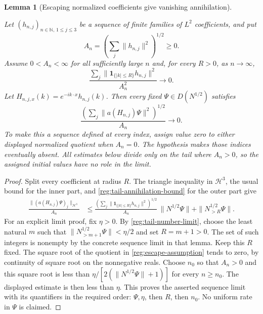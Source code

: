 \documentclass[11pt,a4paper]{article}
\newtheorem{lemma}[theorem]{Lemma}
\theoremstyle{definition}
\theoremstyle{remark}
\newcommand{\proofid}[1]{\par\smallskip{\normalfont\scriptsize\color{inkblue}Stable ID: \nolinkurl{#1}}\par\smallskip}
\begin{document}
\begin{lemma}[Escaping normalized coefficients give vanishing annihilation]
\label{reg:annihilation_escape}
\proofid{reg:annihilation_escape}
\par{}\par\smallskip

Let \((h_{n,j})_{n\in\mathbb N,\,1\leq j\leq3}\) be a sequence of
finite families of \(L^2\) coefficients, and put
\[
 A_n=\left(\sum_j\|h_{n,j}\|^2\right)^{1/2}\geq0.
\]
Assume \(0<A_n<\infty\) for all sufficiently large \(n\) and, for every
\(R>0\), as \(n\to\infty\),
\begin{equation}
 \frac{\sum_j\|\mathbf1_{\{|k|\leq R\}}h_{n,j}\|^2}{A_n^2}
 \longrightarrow0.
 \label{reg:escape-assumption}
\end{equation}
Let \(H_{n,j,x}(k)=e^{-ik\cdot x}h_{n,j}(k)\).  Then every fixed
\(\Psi\in D(N^{1/2})\) satisfies
\begin{equation}
 \frac{\left(\sum_j\|a(H_{n,j})\Psi\|^2\right)^{1/2}}{A_n}
 \longrightarrow0.
 \label{reg:escape-conclusion}
\end{equation}
To make this a sequence defined at every index, assign value zero
to either displayed normalized quotient when $A_n=0$. The
hypothesis makes those indices eventually absent. All estimates
below divide only on the tail where $A_n>0$, so the assigned
initial values have no role in the limit.
\end{lemma}
\begin{proof}
Split every coefficient at radius \(R\).  The triangle inequality in
\(\mathcal H^3\), the usual bound for the inner part, and
\eqref{reg:tail-annihilation-bound} for the outer part give
\begin{align*}
 \frac{\|(a(H_{n,j})\Psi)_j\|_{\mathcal H^3}}{A_n}
 &\leq
 \frac{\left(\sum_j\|\mathbf1_{\{|k|\leq R\}}h_{n,j}\|^2\right)^{1/2}}
      {A_n}\,\|N^{1/2}\Psi\|
      +\|N_{>R}^{1/2}\Psi\|.
\end{align*}
For an explicit limit proof, fix \(\eta>0\). By
\eqref{reg:tail-number-limit}, choose the least natural $m$ such that
$\|N_{>m+1}^{1/2}\Psi\|<\eta/2$ and set $R=m+1>0$.
The set of such integers is nonempty by the concrete sequence
limit in that lemma. Keep this \(R\) fixed. The square root of the
quotient in \eqref{reg:escape-assumption} tends to zero, by continuity
of square root on the nonnegative reals. Choose \(n_0\) so that
\(A_n>0\) and this square root is less than
\(\eta/[2(\|N^{1/2}\Psi\|+1)]\) for every \(n\geq n_0\).
The displayed estimate is then less than \(\eta\). This proves the
asserted sequence limit with its quantifiers in the required order:
\(\Psi,\eta\), then \(R\), then \(n_0\). No uniform rate in
\(\Psi\) is claimed.
\end{proof}
\end{document}
